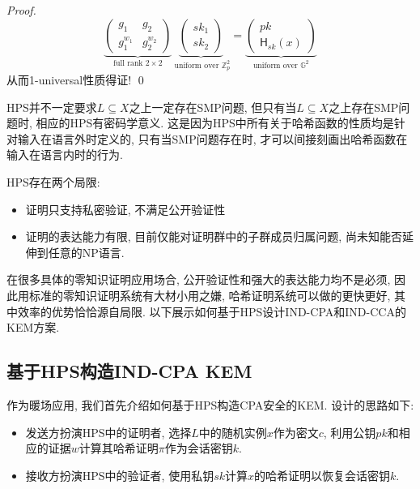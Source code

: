 \begin{proof}
\begin{displaymath}
\underbrace{
\left(\begin{array}{cc}
g_1 & g_2\\
g_1^{w_1} & g_2^{w_2}
\end{array} \right)
}_{\text{full rank~} 2 \times 2} 
\underbrace{
\left(\begin{array}{c}
sk_1\\
sk_2
\end{array} \right) 
}_{\text{~uniform over~} \mathbb{Z}_p^2}= 
\underbrace{
\left(\begin{array}{c}
pk\\
\mathsf{H}_{sk}(x)
\end{array} \right)
}_{\text{uniform over~} \mathbb{G}^2}
\end{displaymath} 
从而1-universal性质得证! \qed
\end{proof}

\begin{remark}
HPS并不一定要求$L \subseteq X$之上一定存在SMP问题, 但只有当$L \subseteq X$之上存在SMP问题时, 相应的HPS有密码学意义. 
这是因为HPS中所有关于哈希函数的性质均是针对输入在语言外时定义的, 只有当SMP问题存在时, 才可以间接刻画出哈希函数在输入在语言内时的行为. 
\end{remark}

HPS存在两个局限: 
\begin{itemize}
    \item 证明只支持私密验证, 不满足公开验证性
    \item 证明的表达能力有限, 目前仅能对证明群中的子群成员归属问题, 尚未知能否延伸到任意的NP语言. 
\end{itemize}
在很多具体的零知识证明应用场合, 公开验证性和强大的表达能力均不是必须, 因此用标准的零知识证明系统有大材小用之嫌, 
哈希证明系统可以做的更快更好, 其中效率的优势恰恰源自局限. 以下展示如何基于HPS设计IND-CPA和IND-CCA的KEM方案. 


\subsection{基于HPS构造IND-CPA KEM}
作为暖场应用, 我们首先介绍如何基于HPS构造CPA安全的KEM. 设计的思路如下: 
\begin{itemize}
\item 发送方扮演HPS中的证明者, 选择$L$中的随机实例$x$作为密文$c$, 利用公钥$pk$和相应的证据$w$计算其哈希证明$\pi$作为会话密钥$k$. 

\item 接收方扮演HPS中的验证者, 使用私钥$sk$计算$x$的哈希证明以恢复会话密钥$k$. 
\end{itemize}

